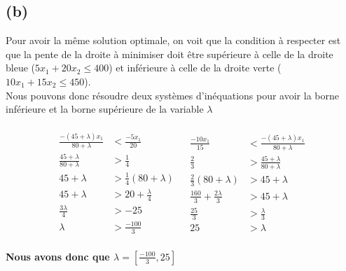 \documentclass{article}
\begin{document}
\subsection*{(b)}
Pour avoir la même solution optimale, on voit que la condition à respecter est que la pente de la droite à minimiser doit être supérieure à celle de la droite bleue ($5x_1 +20x_2 \leq 400$) et inférieure à celle de la droite verte ($10x_1+15x_2 \leq 450$).\\
Nous pouvons donc résoudre deux systèmes d'inéquations pour avoir la borne inférieure et la borne supérieure de la variable $\lambda$
\begin{spacing}{2.5}
   \begin{align*}
      \begin{matrix}
      \begin{aligned}
      \frac{-(45 + \lambda)x_1}{80 + \lambda} & < \frac{-5x_1}{20}                        \\
      \frac{45+\lambda}{80+\lambda}        & > \frac{1}{4}                            \\
      45+\lambda                           & > \frac{1}{4}(80+\lambda)                \\
      45+\lambda                             & > 20+\frac{\lambda}{4}                   \\
      \frac{3\lambda}{4}                     & > -25                                       \\
      \lambda                                 & > \frac{-100}{3}                          
      \end{aligned}
                                              &                                           
      \begin{aligned}
      \frac{-10x_1}{15}                       & < \frac{-(45 + \lambda)x_1}{80 + \lambda} \\
      \frac{2}{3}                            & > \frac{45+\lambda}{80+\lambda}        \\
      \frac{2}{3}(80+\lambda)                & > 45+\lambda                           \\
      \frac{160}{3} + \frac{2\lambda}{3}    & > 45+\lambda                             \\
      \frac{25}{3}                           & > \frac{\lambda}{3}                      \\
      25                                      & >\lambda                                  
      \end{aligned}
      \end{matrix}
   \end{align*}
\end{spacing}
\textbf{Nous avons donc que $\lambda = [\frac{-100}{3} , 25]$}
\pagebreak
\end{document}
